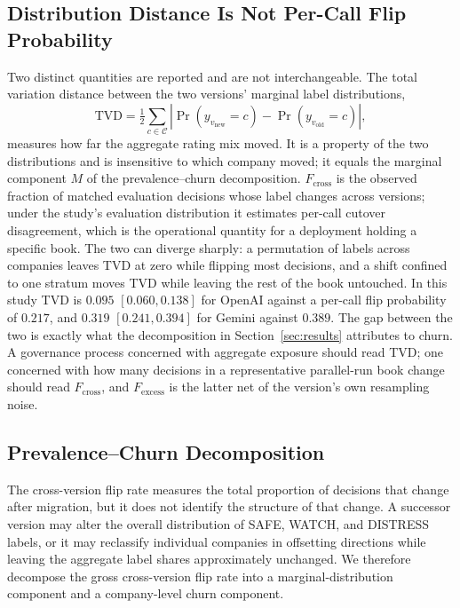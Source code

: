 \documentclass{ieeeaccess}
\begin{document}
\subsection{Distribution Distance Is Not Per-Call Flip Probability}
\label{subsec:distance}
Two distinct quantities are reported and are not interchangeable. The total variation distance
between the two versions' marginal label distributions,
\begin{equation}
\mathrm{TVD} = \tfrac{1}{2}\sum_{c\in\mathcal{C}}
\left| \Pr(y_{v_{\mathrm{new}}}=c) - \Pr(y_{v_{\mathrm{old}}}=c) \right|,
\end{equation}
measures how far the aggregate rating mix moved. It is a property of the two distributions and is
insensitive to which company moved; it equals the marginal component $M$ of the
prevalence--churn decomposition. $F_{\mathrm{cross}}$ is the observed fraction of matched evaluation
decisions whose label changes across versions; under the study's evaluation distribution it estimates
per-call cutover disagreement, which is the operational quantity for a deployment holding a specific
book. The two can diverge sharply: a permutation of labels across companies leaves TVD at zero while
flipping most decisions, and a shift confined to one stratum moves TVD while leaving the rest of the
book untouched. In this study TVD is $0.095$ $[0.060,0.138]$ for OpenAI against a per-call flip
probability of $0.217$, and $0.319$ $[0.241,0.394]$ for Gemini against $0.389$. The gap between the
two is exactly what the decomposition in Section~\ref{sec:results} attributes to churn. A governance
process concerned with aggregate exposure should read TVD; one concerned with how many decisions in a
representative parallel-run book change should read $F_{\mathrm{cross}}$, and $F_{\mathrm{excess}}$ is the latter net
of the version's own resampling noise.

\subsection{Prevalence--Churn Decomposition}
The cross-version flip rate measures the total proportion of decisions that change after migration, but it does not identify the structure of that change. A successor version may alter the overall distribution of SAFE, WATCH, and DISTRESS labels, or it may reclassify individual companies in offsetting directions while leaving the aggregate label shares approximately unchanged. We therefore decompose the gross cross-version flip rate into a marginal-distribution component and a company-level churn component.
\end{document}
